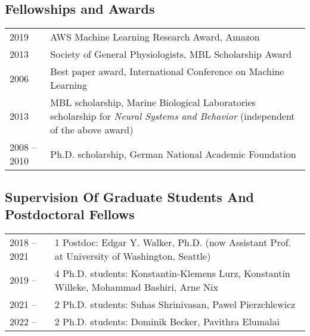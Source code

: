 \documentclass[COG,11pt]{ercgrant}
\begin{document}
\subsection{Fellowships and Awards}
\begin{tabular}{p{3cm}p{12cm}}
2019 & AWS Machine Learning Research Award, Amazon\\
2013 & Society of General Physiologists, MBL Scholarship Award\\
2006 & Best paper award, International Conference on Machine Learning\\
2013 & MBL scholarship, Marine Biological Laboratories
  scholarship for {\em Neural Systems and Behavior} (independent of the above award)\\
2008 -- 2010 & Ph.D. scholarship, German National Academic Foundation
\end{tabular}

\subsection{Supervision Of Graduate Students And Postdoctoral Fellows}
\begin{tabular}{p{3cm}p{12cm}}
2018 -- 2021 & 1 Postdoc: Edgar Y. Walker, Ph.D. (now Assistant Prof. at University of Washington, Seattle)\\
2019 -- & 4 Ph.D. students: Konstantin-Klemens Lurz, Konstantin Willeke, Mohammad Bashiri, Arne Nix\\
2021 -- & 2 Ph.D. students: Suhas Shrinivasan, Pawel Pierzchlewicz\\
2022 -- & 2 Ph.D. students: Dominik Becker, Pavithra Elumalai
\end{tabular}
\end{document}

